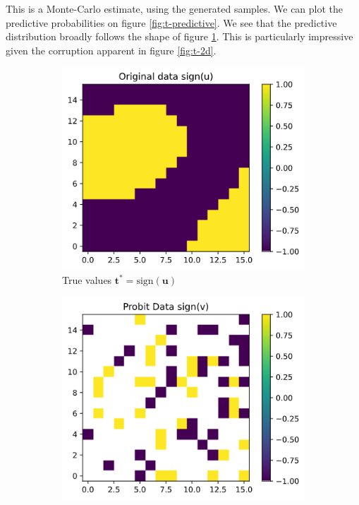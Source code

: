 \documentclass[]{article}
\newcommand{\tbold}{\boldsymbol{t}}
\newcommand{\ubold}{\boldsymbol{u}}
\begin{document}
This is a Monte-Carlo estimate, using the generated samples. We can plot the predictive probabilities on figure \ref{fig:t-predictive}. We see that the predictive distribution broadly follows the shape of figure \ref{fig:sign-u}. This is particularly impressive given the corruption apparent in figure \ref{fig:t-2d}.
%
\begin{figure}[!h]
	\centering
	\begin{subfigure}{0.32\linewidth}
		\includegraphics[width=\linewidth]{sign-u.png}
		\caption{True values $\tbold^* = \textrm{sign}(\ubold)$}
		\label{fig:sign-u}
	\end{subfigure}
	\begin{subfigure}{0.32\linewidth}
		\includegraphics[width=\linewidth]{t-2d.png}

\end{subfigure}
\end{figure}
\end{document}
